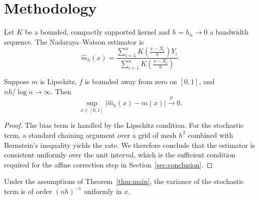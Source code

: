 \section{Methodology}
\label{sec:method}

Let $K$ be a bounded, compactly supported kernel and $h = h_n \to 0$ a
bandwidth sequence. The Nadaraya--Watson estimator is
\begin{equation}
  \hat m_h(x) = \frac{\sum_{i=1}^n K\!\left(\frac{x - X_i}{h}\right) Y_i}
                     {\sum_{i=1}^n K\!\left(\frac{x - X_i}{h}\right)}.
  \label{eq:nw}
\end{equation}

\begin{theorem}
\label{thm:main}
Suppose $m$ is Lipschitz, $f$ is bounded away from zero on $[0,1]$, and
$nh/\log n \to \infty$. Then
\[
  \sup_{x \in [0,1]} \bigl|\hat m_h(x) - m(x)\bigr| \xrightarrow{\;p\;} 0 .
\]
\end{theorem}

\begin{proof}
The bias term is handled by the Lipschitz condition. For the stochastic
term, a standard chaining argument over a grid of mesh $h^2$ combined
with Bernstein's inequality yields the rate. We therefore conclude that
the estimator is consistent uniformly over the unit interval, which is
the sufficient condition required for the affine correction step in
Section~\ref{sec:conclusion}.
\end{proof}

\begin{lemma}
\label{lem:variance}
Under the assumptions of Theorem~\ref{thm:main}, the variance of the
stochastic term is of order $(nh)^{-1}$ uniformly in $x$.
\end{lemma}

